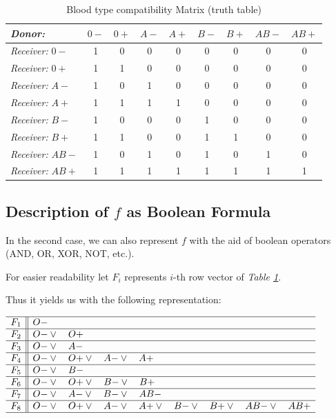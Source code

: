 \documentclass{article}
\begin{document}
\begin{table}[h!]
    \centering
    \begin{tabular}{|l|c|c|c|c|c|c|c|c|}
    \hline
    \textit{Donor:} & $0-$ & $0+$ & $A-$ & $A+$ & $ B-$ & $B+$ & $AB-$ & $AB+$  \\
      \hline\hline
    \textit{Receiver:} $0-$  & 1 & 0 & 0 &  0 & 0 & 0 & 0  &  0 \\
      \hline
    \textit{Receiver:}  $0+$  & 1 & 1 & 0 & 0 &  0 & 0 & 0   & 0  \\
      \hline
    \textit{Receiver:}  $A-$ &1  & 0 & 1 &  0 & 0 & 0  &  0 &  0 \\
      \hline
    \textit{Receiver:}  $A+$ & 1 & 1 & 1 & 1 & 0 &  0 & 0  & 0  \\
      \hline
     \textit{Receiver:}  $ B-$ &  1& 0 & 0 & 0 &  1 &  0 & 0 &  0 \\
      \hline
      \textit{Receiver:} $B+$ & 1 & 1 & 0 & 0 & 1 &1 & 0  & 0  \\
      \hline
     \textit{Receiver:}  $AB-$ & 1  & 0 &1 & 0 &1 & 0 & 1 &  0 \\
      \hline
     \textit{Receiver:} $AB+$  &1 & 1 &  1 & 1 & 1 & 1 & 1 &  1 \\
      \hline
    \end{tabular}
    \caption{Blood type compatibility Matrix (truth table)}
    \label{tab:bloodtypetruth}
\end{table}

\subsection{Description of $f$ as Boolean Formula}

In the second case, we can also represent $f$ with the aid of boolean operators (AND, OR, XOR, NOT, etc.). 

For easier readability let $F_i$  represents $i$-th row vector of \textit{Table \ref{tab:bloodtypetruth}}.

Thus it yields us with the following representation: 

\begin{table}[h!]
    \centering
$
\begin{array}{c||l}
\hline
F_1 & O{-} \\
\hline
F_2 & O{-} \lor~~\  O{+} \\
\hline
F_3 & O{-} \lor~~\  A{-} \\
\hline
F_4 & O{-} \lor~~\  O{+} \lor~~\  A{-} \lor~~\  A{+} \\
\hline
F_5 & O{-} \lor~~\  B{-} \\
\hline
F_6 & O{-} \lor~~\  O{+} \lor~~\  B{-} \lor~~\  B{+} \\
\hline
F_7 & O{-} \lor~~\  A{-} \lor~~\  B{-} \lor~~\  AB{-} \\
\hline
F_8 & O{-} \lor~~\  O{+} \lor~~\  A{-} \lor~~\  A{+} \lor~~\  B{-} \lor~~\  B{+} \lor~~\  AB{-} \lor~~\  AB{+} \\
\hline
\end{array}
$    
    \caption{Rewriting the blood type \textit{Truth Table} with boolean operators}
    \label{tab:secondpoz}
\end{table}
\end{document}
